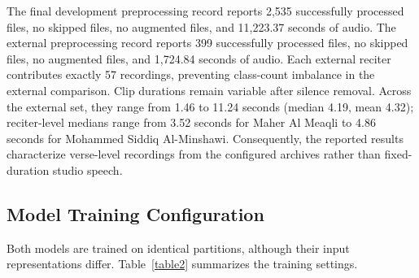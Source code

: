 \documentclass[a4paper,conference]{IEEEtran}
\begin{document}
The final development preprocessing record reports 2,535 successfully processed files, no skipped files, no augmented files, and 11,223.37 seconds of audio. The external preprocessing record reports 399 successfully processed files, no skipped files, no augmented files, and 1,724.84 seconds of audio. Each external reciter contributes exactly 57 recordings, preventing class-count imbalance in the external comparison. Clip durations remain variable after silence removal. Across the external set, they range from 1.46 to 11.24 seconds (median 4.19, mean 4.32); reciter-level medians range from 3.52 seconds for Maher Al Meaqli to 4.86 seconds for Mohammed Siddiq Al-Minshawi. Consequently, the reported results characterize verse-level recordings from the configured archives rather than fixed-duration studio speech.

\begin{table}[t]
\centering
\caption{Dataset partitions used in the experimental evaluation.}
\label{table1}
\renewcommand{\arraystretch}{1.2}
\setlength{\tabcolsep}{6pt}
\end{table}

\subsection{Model Training Configuration}

Both models are trained on identical partitions, although their input representations differ. Table~\ref{table2} summarizes the training settings.
\end{document}
